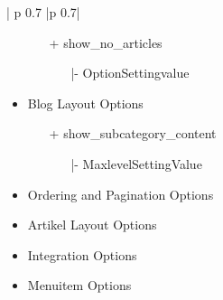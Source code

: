 \begin{minipage}{0.8\textwidth}
\begin{longtable}{| p {0.7\textwidth} |p {0.7\textwidth}|}
\begin{itemize}
\begin{enumerate}
	   	\item[+] show\_no\_articles
	   		\begin{enumerate}
	   			\item[|-] OptionSettingvalue
	   		\end{enumerate} 
	\end{enumerate}
\item Blog Layout Options
	\begin{enumerate}
		\item[+] show\_subcategory\_content
			\begin{enumerate}
			\item[|-] MaxlevelSettingValue
			\end{enumerate}
	\end{enumerate}
\item Ordering and Pagination Options
\item Artikel Layout Options
\item Integration Options
\item Menuitem Options 
\end{itemize}
\\ \hline
\end{longtable}
\end{minipage}

